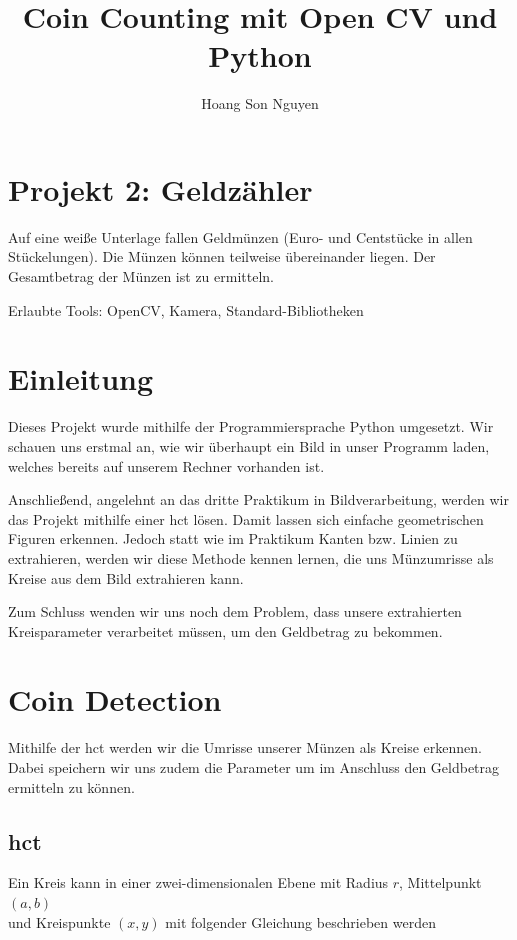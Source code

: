 \documentclass[12pt, a4paper]{scrartcl}
\title{Coin Counting mit Open CV und Python}
\author{Hoang Son Nguyen}
\date{}
\begin{document}
\maketitle

\section*{Projekt 2: Geldzähler} 
Auf eine weiße Unterlage fallen Geldmünzen (Euro- und Centstücke in allen Stückelungen). Die Münzen können teilweise übereinander liegen. Der Gesamtbetrag der Münzen ist zu ermitteln.\newline

Erlaubte Tools: OpenCV, Kamera, Standard-Bibliotheken

\section*{Einleitung}
Dieses Projekt wurde mithilfe der Programmiersprache Python umgesetzt. Wir schauen uns erstmal an, wie wir überhaupt ein Bild in unser Programm laden, welches bereits auf unserem Rechner vorhanden ist.\newline

Anschließend, angelehnt an das dritte Praktikum in Bildverarbeitung, werden wir das Projekt mithilfe einer \acl{hct} lösen. Damit lassen sich einfache geometrischen Figuren erkennen. Jedoch statt wie im Praktikum Kanten bzw. Linien zu extrahieren, werden wir diese Methode kennen lernen, die uns Münzumrisse als Kreise aus dem Bild extrahieren kann.\newline

Zum Schluss wenden wir uns noch dem Problem, dass unsere extrahierten Kreisparameter verarbeitet müssen, um den Geldbetrag zu bekommen.

\section{Coin Detection}
Mithilfe der \acl{hct} werden wir die Umrisse unserer Münzen als Kreise erkennen. Dabei speichern wir uns zudem die Parameter um im Anschluss den Geldbetrag ermitteln zu können.

\subsection{\acf{hct}}

Ein Kreis kann in einer zwei-dimensionalen Ebene mit Radius \(r\), Mittelpunkt \((a,b)\)\\ und Kreispunkte \((x,y)\) mit folgender Gleichung beschrieben werden
\end{document}
